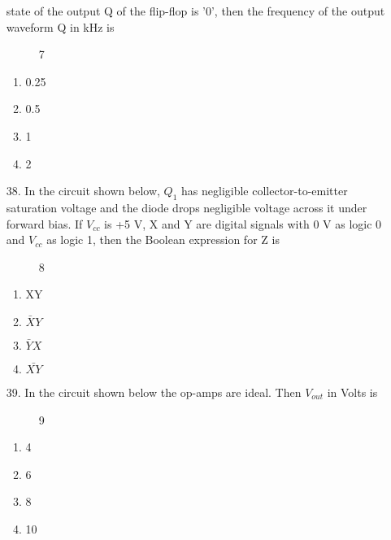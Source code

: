 \documentclass[journal]{IEEEtran}
\begin{document}
\begin{enumerate}
    state of the output Q of the flip-flop is '0', then the frequency of the output waveform Q in kHz is
    \begin{figure}[!ht]
        \centering
        \caption{7}
    \end{figure}
    \begin{enumerate}[label=(\Alph*)]
        \item 0.25
        \item 0.5
        \item 1
        \item 2
    \end{enumerate}
    \item[38.]  In the circuit shown below, $Q_1$ has negligible collector-to-emitter saturation voltage and the diode
    drops negligible voltage across it under forward bias. If $V_{cc}$ is +5 V, X and Y are digital signals
    with 0 V as logic 0 and $V_{cc}$ as logic 1, then the Boolean expression for Z is 
    \begin{figure}[!ht]
        \centering
        \caption{8}
    \end{figure}
    \begin{enumerate}[label=(\Alph*)]
        \item XY
        \item $\bar{X}Y$
        \item $\bar{Y}X$
        \item $\bar{XY}$
    \end{enumerate}
    
    \item[39.] In the circuit shown below the op-amps are ideal. Then $V_{out}$ in Volts is
    \begin{figure}[!ht]
        \centering
        \caption{9}
    \end{figure}
    \begin{enumerate}[label=(\Alph*)]
        \item 4
        \item 6
        \item 8
        \item 10
    \end{enumerate} 
\end{enumerate}
\end{document}
